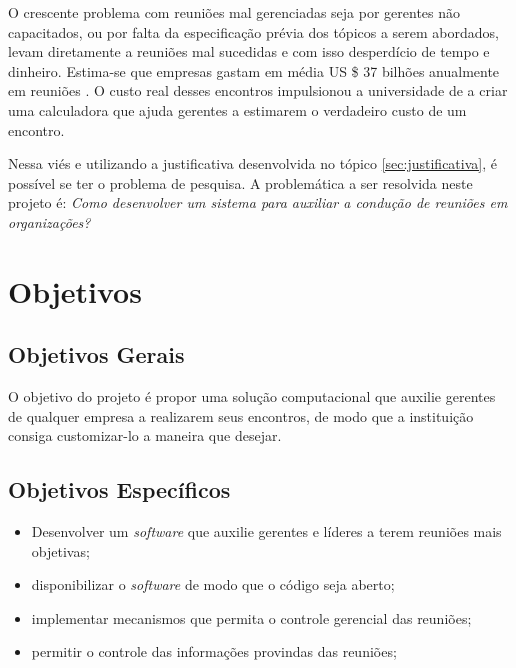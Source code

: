 O crescente problema com reuniões mal gerenciadas seja por gerentes não capacitados, ou por falta da especificação prévia dos tópicos a serem abordados, levam diretamente a reuniões mal sucedidas e com isso desperdício de tempo e dinheiro. Estima-se que empresas gastam em média US \$ 37 bilhões anualmente em reuniões . O custo real desses encontros impulsionou a universidade de  a criar uma calculadora que ajuda gerentes a estimarem o verdadeiro custo de um encontro.

Nessa viés e utilizando a justificativa desenvolvida no tópico \ref{sec:justificativa}, é possível se ter o problema de pesquisa. A problemática a ser resolvida neste projeto é: \textit{Como desenvolver um sistema para auxiliar a condução de reuniões em organizações?}

\section{Objetivos}
\label{sec:objetivos}

\subsection{Objetivos Gerais}
\label{sec:objetivos_gerais}

O objetivo do projeto é propor uma solução computacional que auxilie gerentes de qualquer empresa a realizarem seus encontros, de modo que a instituição consiga customizar-lo a maneira que desejar. 

\subsection{Objetivos Específicos}
\label{sec:objetivos_especificos}

\begin{itemize}
    \item Desenvolver um \textit{software} que auxilie gerentes e líderes a terem reuniões mais objetivas;
    \item disponibilizar o \textit{software} de modo que o código seja aberto;
    \item implementar mecanismos que permita o controle gerencial das reuniões;
    \item permitir o controle das informações provindas das reuniões;
\end{itemize}